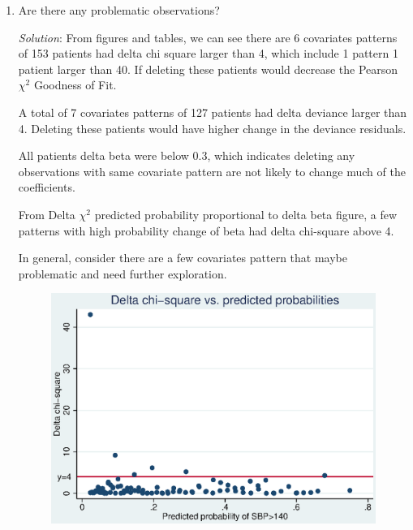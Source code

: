 \documentclass{article}
\begin{document}
  \begin{enumerate}
    \item Are there any problematic observations?
    
    \textit{Solution}: From figures and tables, we can see there are 6 covariates patterns of 153 patients had delta chi square larger than 4, which include 1 pattern 1 patient larger than 40. If deleting these patients would decrease the Pearson $\chi^2$ Goodness of Fit. \par
    A total of 7 covariates patterns of 127 patients had delta deviance larger than 4. Deleting these patients would have higher change in the deviance residuals. \par
    All patients delta beta were below 0.3, which indicates deleting any observations with same covariate pattern are not likely to change much of the coefficients. \par
    From Delta $\chi^2$ predicted probability proportional to delta beta figure, a few patterns with high probability change of beta had delta chi-square above 4. \par
    In general, consider there are a few covariates pattern that maybe problematic and need further exploration.
    
    \def\figwidths{.8\linewidth}
    
    
    \begin{figure}
    \centering
    \includegraphics[width=\figwidths]{04/part4_Deltachisq_p_.eps}
    \end{figure} 
    

\end{enumerate}
\end{document}
